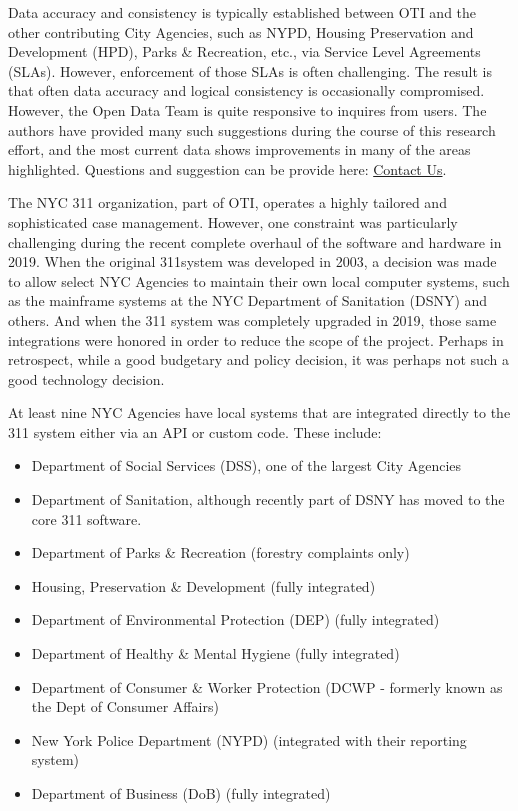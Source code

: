 \documentclass[12pt, titlepage]{article}
\begin{document}
Data accuracy and consistency is typically established between OTI and the other contributing
City Agencies, such as NYPD, Housing Preservation and Development (HPD), Parks \& Recreation, etc.,
via Service Level Agreements (SLAs). However, enforcement of those SLAs is often challenging. The 
result is that often data accuracy and logical consistency is occasionally compromised. However, the Open Data
Team is quite responsive to inquires from users. The authors have provided many such 
suggestions during the course of this research effort, and the most current data shows improvements
in many of the areas highlighted. Questions and suggestion  can be provide here: 
\href{https://opendata.cityofnewyork.us/engage/}{Contact Us}.

The NYC 311 organization, part of OTI, operates a highly tailored and sophisticated case
management. However, one constraint was particularly challenging during the recent complete overhaul
of the software and hardware in 2019. When the original 311system was developed in 2003, 
a decision was made to allow select NYC Agencies to maintain their own local computer systems, 
such as the mainframe systems at the NYC Department of Sanitation (DSNY) and others. 
And when the 311 system was completely upgraded in 2019, those
same integrations were honored in order to reduce the scope of the project. Perhaps in
retrospect, while a good budgetary and policy decision, it was perhaps not such a good technology decision.

At least nine NYC Agencies have local systems that are integrated directly to the 311 system either via
an API or custom code. These include:

\begin{itemize}
	\item Department of Social Services (DSS), one of the largest City Agencies
	\item Department of Sanitation, although recently part of DSNY has moved to the core 311 software.
	\item Department of Parks \& Recreation (forestry complaints only)
	\item Housing, Preservation \& Development (fully integrated)
	\item Department of Environmental Protection (DEP) (fully integrated)
	\item Department of Healthy \& Mental Hygiene (fully integrated) 
	\item Department of Consumer \& Worker Protection (DCWP - formerly known as the Dept of Consumer Affairs)
	\item New York Police Department (NYPD) (integrated with their reporting system)
	\item Department of Business (DoB) (fully integrated)
\end{itemize}
\end{document}
